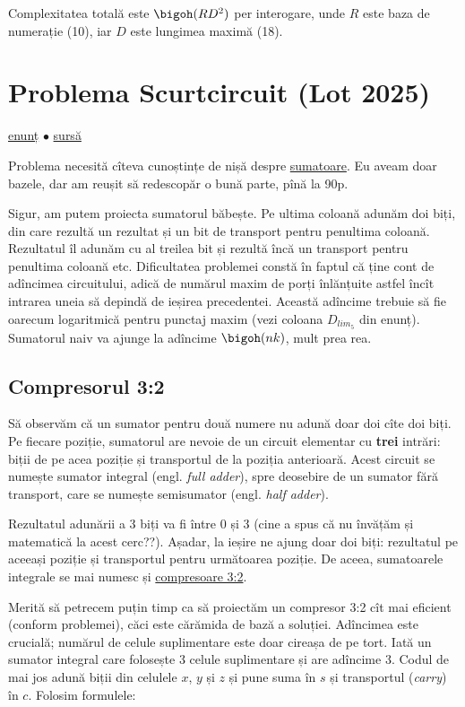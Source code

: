 Complexitatea totală este $\bigoh(R D^2)$ per interogare, unde $R$ este baza de numerație (10), iar $D$ este lungimea maximă (18).


\section{Problema Scurtcircuit (Lot 2025)}
\label{problem:scurtcircuit}

\href{https://kilonova.ro/problems/3805}{enunț}
$\bullet$
\hyperref[code:scurtcircuit]{sursă}

Problema necesită cîteva cunoștințe de nișă despre \href{https://en.wikipedia.org/wiki/Adder_(electronics)}{sumatoare}. Eu aveam doar bazele, dar am reușit să redescopăr o bună parte, pînă la 90p. 

Sigur, am putem proiecta sumatorul băbește. Pe ultima coloană adunăm doi biți, din care rezultă un rezultat și un bit de transport pentru penultima coloană. Rezultatul îl adunăm cu al treilea bit și rezultă încă un transport pentru penultima coloană etc. Dificultatea problemei constă în faptul că ține cont de adîncimea circuitului, adică de numărul maxim de porți înlănțuite astfel încît intrarea uneia să depindă de ieșirea precedentei. Această adîncime trebuie să fie oarecum logaritmică pentru punctaj maxim (vezi coloana $D_{lim_5}$ din enunț). Sumatorul naiv va ajunge la adîncime $\bigoh(nk)$, mult prea rea.

\subsection{Compresorul 3:2}

Să observăm că un sumator pentru două numere nu adună doar doi cîte doi biți. Pe fiecare poziție, sumatorul are nevoie de un circuit elementar cu \textbf{trei} intrări: biții de pe acea poziție și transportul de la poziția anterioară. Acest circuit se numește sumator integral (engl. \textit{full adder}), spre deosebire de un sumator fără transport, care se numește semisumator (engl. \textit{half adder}).

Rezultatul adunării a 3 biți va fi între 0 și 3 (cine a spus că nu învățăm și matematică la acest cerc??). Așadar, la ieșire ne ajung doar doi biți: rezultatul pe aceeași poziție și transportul pentru următoarea poziție. De aceea, sumatoarele integrale se mai numesc și \href{https://en.wikipedia.org/wiki/Adder_(electronics)#3:2_compressors}{compresoare 3:2}.

Merită să petrecem puțin timp ca să proiectăm un compresor 3:2 cît mai eficient (conform problemei), căci este cărămida de bază a soluției. Adîncimea este crucială; numărul de celule suplimentare este doar cireașa de pe tort. Iată un sumator integral care folosește 3 celule suplimentare și are adîncime 3. Codul de mai jos adună biții din celulele $x$, $y$ și $z$ și pune suma în $s$ și transportul (\textit{carry}) în $c$. Folosim formulele:

